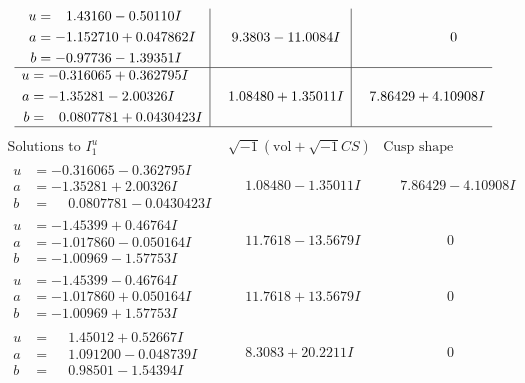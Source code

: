 \documentclass[1p]{elsarticle_modified}
\theoremstyle{definition}
\newcommand{\I}{\sqrt{-1}}
\begin{document}
$$\begin{array}{c|c|c}
\begin{aligned}
u &= \phantom{-}1.43160 - 0.50110 I \\
a &= -1.152710 + 0.047862 I \\
b &= -0.97736 - 1.39351 I\end{aligned}
 & \phantom{-}9.3803 - 11.0084 I & \phantom{-0.000000 } 0 \\ \hline\begin{aligned}
u &= -0.316065 + 0.362795 I \\
a &= -1.35281 - 2.00326 I \\
b &= \phantom{-}0.0807781 + 0.0430423 I\end{aligned}
 & \phantom{-}1.08480 + 1.35011 I & \phantom{-}7.86429 + 4.10908 I\\
 \hline 
 \end{array}$$\newpage$$\begin{array}{c|c|c}  
\text{Solutions to }I^u_{1}& \I (\text{vol} + \sqrt{-1}CS) & \text{Cusp shape}\\
 \hline 
\begin{aligned}
u &= -0.316065 - 0.362795 I \\
a &= -1.35281 + 2.00326 I \\
b &= \phantom{-}0.0807781 - 0.0430423 I\end{aligned}
 & \phantom{-}1.08480 - 1.35011 I & \phantom{-}7.86429 - 4.10908 I \\ \hline\begin{aligned}
u &= -1.45399 + 0.46764 I \\
a &= -1.017860 - 0.050164 I \\
b &= -1.00969 - 1.57753 I\end{aligned}
 & \phantom{-}11.7618 - 13.5679 I & \phantom{-0.000000 } 0 \\ \hline\begin{aligned}
u &= -1.45399 - 0.46764 I \\
a &= -1.017860 + 0.050164 I \\
b &= -1.00969 + 1.57753 I\end{aligned}
 & \phantom{-}11.7618 + 13.5679 I & \phantom{-0.000000 } 0 \\ \hline\begin{aligned}
u &= \phantom{-}1.45012 + 0.52667 I \\
a &= \phantom{-}1.091200 - 0.048739 I \\
b &= \phantom{-}0.98501 - 1.54394 I\end{aligned}
 & \phantom{-}8.3083 + 20.2211 I & \phantom{-0.000000 } 0 \\ \hline\begin{aligned}

\end{aligned}
\end{array}$$
\end{document}
